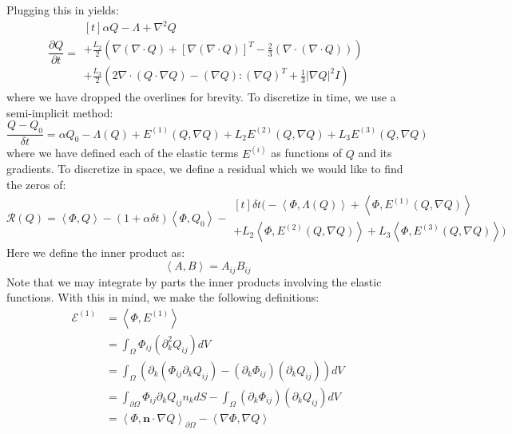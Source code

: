 \documentclass[reqno]{article}
\begin{document}
Plugging this in yields:
\begin{equation}
    \frac{\partial Q}{\partial t}
    =
    \begin{multlined}[t]
        \alpha Q - \Lambda + \nabla^2 Q \\
        + \frac{L_2}{2} \left(
        \nabla \left( \nabla \cdot Q \right)
        + \left[ \nabla \left( \nabla \cdot Q \right) \right]^T
        - \tfrac23 \left( \nabla \cdot \left( \nabla \cdot Q \right) \right)
        \right)\\
        + \frac{L_3}{2} \left(
        2 \nabla \cdot \left( Q \cdot \nabla Q \right)
        - \left( \nabla Q \right) : \left( \nabla Q \right)^T
        + \tfrac13 \left| \nabla Q \right|^2 I
      \right)
    \end{multlined}
\end{equation}
where we have dropped the overlines for brevity.
To discretize in time, we use a semi-implicit method:
\begin{equation}
    \frac{Q - Q_0}{\delta t}
    =
    \alpha Q_0 - \Lambda(Q) 
    + E^{(1)}(Q, \nabla Q)
    + L_2 E^{(2)}(Q, \nabla Q)
    + L_3 E^{(3)}(Q, \nabla Q)
\end{equation}
where we have defined each of the elastic terms $E^{(i)}$ as functions of $Q$ and its gradients.
To discretize in space, we define a residual which we would like to find the zeros of:
\begin{equation}
    \mathcal{R}(Q)
    =
    \left<\Phi, Q\right> 
    - \left(1 + \alpha \delta t \right) \left<\Phi, Q_0\right>
    - 
    \begin{multlined}[t]
    \delta t \bigl(
        - \left<\Phi, \Lambda(Q) \right>
        + \left<\Phi, E^{(1)}(Q, \nabla Q)\right> \\
        + L_2 \left<\Phi, E^{(2)}(Q, \nabla Q)\right>
        + L_3 \left<\Phi, E^{(3)}(Q, \nabla Q)\right>
    \bigr)
    \end{multlined}
\end{equation}
Here we define the inner product as:
\begin{equation}
    \left<A, B\right>
    =
    A_{ij} B_{ij}
\end{equation}
Note that we may integrate by parts the inner products involving the elastic functions.
With this in mind, we make the following definitions:
\begin{equation}
    \begin{split}
        \mathcal{E}^{(1)}
        &=
        \left< \Phi, E^{(1)} \right> \\
        &= \int_\Omega \Phi_{ij} (\partial_k^2 Q_{ij}) dV \\
        &= \int_\Omega \left( \partial_k \left( \Phi_{ij} \partial_k Q_{ij} \right)
        - (\partial_k \Phi_{ij}) (\partial_k Q_{ij}) \right) dV \\
        &= \int_{\partial \Omega} \Phi_{ij} \partial_k Q_{ij} n_k dS
        - \int_\Omega (\partial_k \Phi_{ij}) (\partial_k Q_{ij}) dV \\
        &=
        \left< \Phi, \mathbf{n} \cdot \nabla Q \right>_{\partial \Omega}
        - \left< \nabla \Phi, \nabla Q \right>
    \end{split}
\end{equation}
\end{document}
